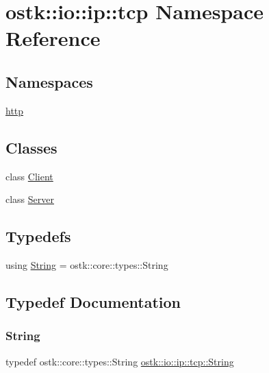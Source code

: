 \hypertarget{namespaceostk_1_1io_1_1ip_1_1tcp}{}\section{ostk\+:\+:io\+:\+:ip\+:\+:tcp Namespace Reference}
\label{namespaceostk_1_1io_1_1ip_1_1tcp}
\subsection*{Namespaces}
\begin{DoxyCompactItemize}
\item 
 \hyperlink{namespaceostk_1_1io_1_1ip_1_1tcp_1_1http}{http}
\end{DoxyCompactItemize}
\subsection*{Classes}
\begin{DoxyCompactItemize}
\item 
class \hyperlink{classostk_1_1io_1_1ip_1_1tcp_1_1_client}{Client}
\item 
class \hyperlink{classostk_1_1io_1_1ip_1_1tcp_1_1_server}{Server}
\end{DoxyCompactItemize}
\subsection*{Typedefs}
\begin{DoxyCompactItemize}
\item 
using \hyperlink{namespaceostk_1_1io_1_1ip_1_1tcp_a0913903efda9362d4b0a14e5031434d6}{String} = ostk\+::core\+::types\+::\+String
\end{DoxyCompactItemize}


\subsection{Typedef Documentation}
\mbox{\label{namespaceostk_1_1io_1_1ip_1_1tcp_a0913903efda9362d4b0a14e5031434d6}} 
\subsubsection{\texorpdfstring{String}{String}}
{\footnotesize\ttfamily typedef ostk\+::core\+::types\+::\+String \hyperlink{namespaceostk_1_1io_1_1ip_1_1tcp_a0913903efda9362d4b0a14e5031434d6}{ostk\+::io\+::ip\+::tcp\+::\+String}}

